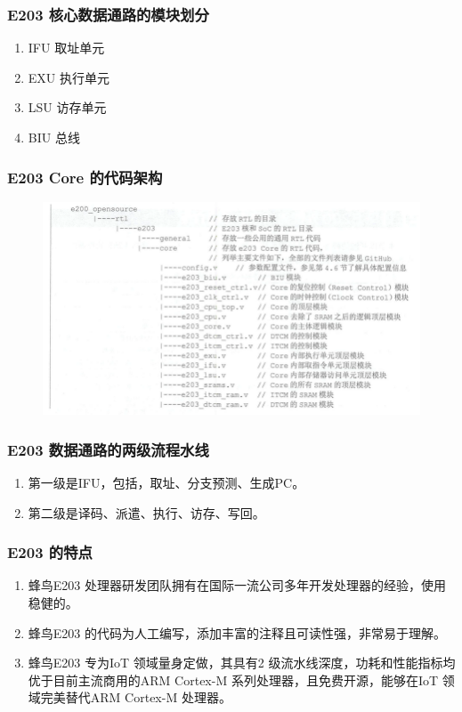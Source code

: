 \documentclass[a4paper, 14pt, oneside]{book} %
\numberwithin{equation}{subsection}
\begin{document}
			\subsubsection{E203 核心数据通路的模块划分}
				\begin{enumerate}
					\item 
						IFU 取址单元
					\item 
						EXU 执行单元
					\item 
						LSU 访存单元
					\item 
						BIU 总线
				\end{enumerate}	

			\subsubsection{E203 Core 的代码架构}
				\begin{figure}[!htbp]
					\centering
					\includegraphics[scale=0.5]{img/framework.png}   
				\end{figure}

			\subsubsection{E203 数据通路的两级流程水线}
				\begin{enumerate}
					\item 
						第一级是IFU，包括，取址、分支预测、生成PC。
					\item 
						第二级是译码、派遣、执行、访存、写回。
				\end{enumerate}	

			\subsubsection{E203 的特点}
				\begin{enumerate}
					\item 
						蜂鸟E203 处理器研发团队拥有在国际一流公司多年开发处理器的经验，使用稳健的。
					\item 
						蜂鸟E203 的代码为人工编写，添加丰富的注释且可读性强，非常易于理解。
					\item 
						蜂鸟E203 专为IoT 领域量身定做，其具有2 级流水线深度，功耗和性能指标均优于目前主流商用的ARM Cortex-M 系列处理器，且免费开源，能够在IoT 领域完美替代ARM Cortex-M 处理器。
				\end{enumerate}	
\end{document}
